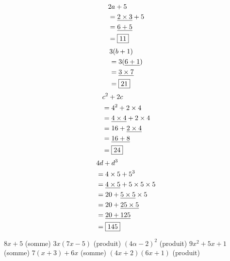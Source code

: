 \documentclass[../Cours.tex]{subfiles}
\begin{document}
\begin{questions}
        \question 
            \begin{align*}
                &2a+5 \\
                &= \underline{2 \times 3} + 5 \\
                &= \underline{6+5} \\
                &= \fbox{11}
            \end{align*}
        \question
            \begin{align*}
                &3(b+1) \\
                &= 3(\underline{6+1}) \\
                &= \underline{3 \times 7} \\
                &= \fbox{21}
            \end{align*}
        \question 
            \begin{align*}
                &c^2+2c \\
                &= 4^2 + 2 \times 4 \\
                &= \underline{4 \times 4} + 2 \times 4 \\
                &= 16 + \underline{2 \times 4} \\
                &= \underline{16 + 8} \\
                &= \fbox{24}
            \end{align*}
        \question 
            \begin{align*}
                &4d + d^3 \\
                &= 4 \times 5 + 5^3 \\
                &= \underline{4 \times 5} + 5 \times 5 \times 5 \\
                &= 20 + \underline{5 \times 5} \times 5 \\
                &= 20 + \underline{25 \times 5} \\
                &= \underline{20 + 125} \\
                &= \fbox{145}
            \end{align*}

        \question $8x+5$ (somme)
        \question $3x(7x-5)$ (produit)
        \question $(4\alpha - 2)^2$ (produit)
        \question $9x^2+5x+1$ (somme)
        \question $7(x+3) + 6x$ (somme)
        \question $(4x+2)(6x+1)$ (produit)



\end{questions}
\end{document}
